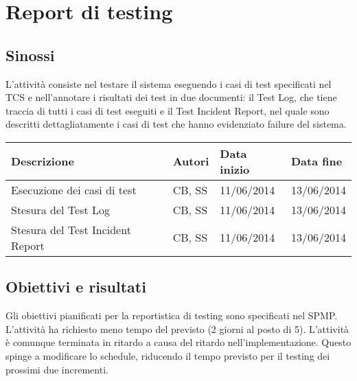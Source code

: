 \section{Report di testing}
\subsection{Sinossi}
L'attività consiste nel testare il sistema eseguendo i casi di test specificati nel TCS e nell'annotare i risultati dei test in due documenti: il Test Log, che tiene traccia di tutti i casi di test eseguiti e il Test Incident Report, nel quale sono descritti dettagliatamente i casi di test che hanno evidenziato failure del sistema.

\begin{table}[ht]
 \begin{tabular}{|p{6cm}|p{2cm}|p{2cm}|p{2cm}|}
    \hline
    \rowcolor{Gray}\textbf{Descrizione}			& \textbf{Autori}		& \textbf{Data inizio}			& \textbf{Data fine}	\\
    \hline
    Esecuzione dei casi di test				& CB, SS			& 11/06/2014				& 13/06/2014		\\
    \hline
    Stesura del Test Log				& CB, SS			& 11/06/2014				& 13/06/2014		\\
    \hline
    Stesura del Test Incident Report			& CB, SS			& 11/06/2014				& 13/06/2014		\\
    \hline
 \end{tabular}
\end{table}

\subsection{Obiettivi e risultati}
Gli obiettivi pianificati per la reportistica di testing sono specificati nel SPMP. L'attività ha richiesto meno tempo del previsto (2 giorni al posto di 5). L'attività è comunque  terminata in ritardo a causa del ritardo nell'implementazione. Questo spinge a modificare lo schedule, riducendo il tempo previsto per il testing dei prossimi due incrementi. 

